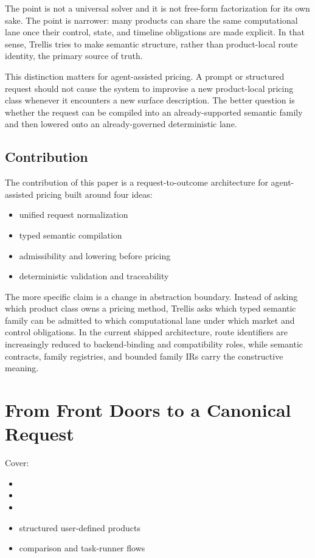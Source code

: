 \documentclass[11pt]{article}
\begin{document}
The point is not a universal solver and it is not free-form factorization for
its own sake. The point is narrower: many products can share the same
computational lane once their control, state, and timeline obligations are made
explicit. In that sense, Trellis tries to make semantic structure, rather than
product-local route identity, the primary source of truth.

This distinction matters for agent-assisted pricing. A prompt or structured
request should not cause the system to improvise a new product-local pricing
class whenever it encounters a new surface description. The better question is
whether the request can be compiled into an already-supported semantic family
and then lowered onto an already-governed deterministic lane.

\subsection{Contribution}
The contribution of this paper is a request-to-outcome architecture for
agent-assisted pricing built around four ideas:
\begin{itemize}
    \item unified request normalization
    \item typed semantic compilation
    \item admissibility and lowering before pricing
    \item deterministic validation and traceability
\end{itemize}

The more specific claim is a change in abstraction boundary. Instead of asking
which product class owns a pricing method, Trellis asks which typed semantic
family can be admitted to which computational lane under which market and
control obligations. In the current shipped architecture, route identifiers are
increasingly reduced to backend-binding and compatibility roles, while semantic
contracts, family registries, and bounded family IRs carry the constructive
meaning.

\section{From Front Doors to a Canonical Request}

Cover:
\begin{itemize}
    \item {}
    \item {}
    \item {}
    \item structured user-defined products
    \item comparison and task-runner flows
\end{itemize}
\end{document}
